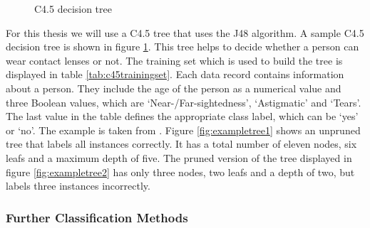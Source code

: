 \begin{figure}[htb]
	\centering
	\qquad
	\caption{
		C4.5 decision tree \autocite[Fig. 4.2]{Chapman:2015}
	}
	\label{fig:exampletree}
\end{figure}

For this thesis we will use a C4.5 tree that uses the J48 algorithm. A sample C4.5 decision tree is shown in figure \ref{fig:exampletree}. This tree helps to decide whether a person can wear contact lenses or not. The training set which is used to build the tree is displayed in table \ref{tab:c45trainingset}. Each data record contains information about a person. They include the age of the person as a numerical value and three Boolean values, which are `Near-/Far-sightedness', `Astigmatic' and `Tears'. The last value in the table defines the appropriate class label, which can be `yes' or `no'. The example is taken from \autocite{Chapman:2015}. Figure \ref{fig:exampletree1} shows an unpruned tree that labels all instances correctly. It has a total number of eleven nodes, six leafs and a maximum depth of five. The pruned version of the tree displayed in figure \ref{fig:exampletree2} has only three nodes, two leafs and a depth of two, but labels three instances incorrectly.

\subsubsection{Further Classification Methods}

